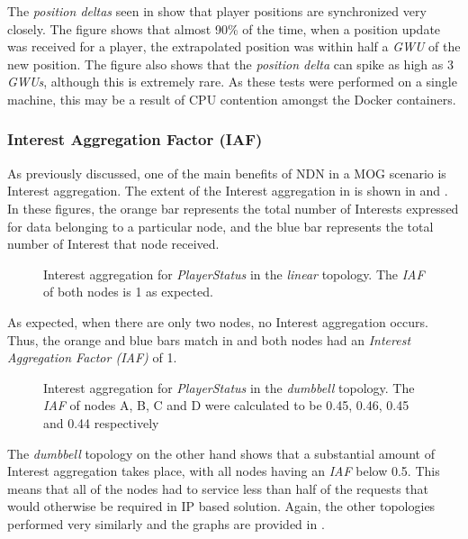 The \textit{position deltas} seen in  show that player positions are synchronized very closely. The figure shows that almost 90\% of the time, when a position update was received for a player, the extrapolated position was within half a \textit{GWU} of the new position. The figure also shows that the \textit{position delta} can spike as high as 3 \textit{GWUs}, although this is extremely rare. As these tests were performed on a single machine, this may be a result of CPU contention amongst the Docker containers.



\subsubsection*{Interest Aggregation Factor (IAF)}
As previously discussed, one of the main benefits of NDN in a MOG scenario is Interest aggregation. The extent of the Interest aggregation in \game{} is shown in  and . In these figures, the orange bar represents the total number of Interests expressed for data belonging to a particular node, and the blue bar represents the total number of Interest that node received. 

\begin{figure}[H]
    \centering
    \caption{Interest aggregation for \textit{PlayerStatus} in the \textit{linear} topology. The \textit{IAF} of both nodes is 1 as expected.}
    \label{fig:eval:basic:interest-agg-linear}
\end{figure}

As expected, when there are only two nodes, no Interest aggregation occurs. Thus, the orange and blue bars match in  and both nodes had an \textit{Interest Aggregation Factor (IAF)} of 1.

\begin{figure}[H]
    \centering
    \caption{Interest aggregation for \textit{PlayerStatus} in the \textit{dumbbell} topology. The \textit{IAF} of nodes A, B, C and D were calculated to be 0.45, 0.46, 0.45 and 0.44 respectively}
    \label{fig:eval:basic:interest-agg-dumbbell}
\end{figure}


The \textit{dumbbell} topology on the other hand shows that a substantial amount of Interest aggregation takes place, with all nodes having an \textit{IAF} below 0.5. This means that all of the nodes had to service less than half of the requests that would otherwise be required in IP based solution. Again, the other topologies performed very similarly and the graphs are provided in .

